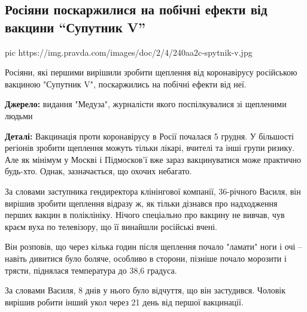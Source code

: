  
 
 
 
 
 
\subsection{Росіяни поскаржилися на побічні ефекти від вакцини \enquote{Супутник V}}
\label{sec:22_12_2020.news.ua.pravda.1.sputnik_v_pobichni_effekty}

\ifcmt
pic https://img.pravda.com/images/doc/2/4/240aa2c-spytnik-v.jpg
\fi

Росіяни, які першими вирішили зробити щеплення від коронавірусу російською
вакциною "Супутник V", поскаржились на побічні ефекти від неї.

\textbf{Джерело:} видання "Медуза", журналісти якого поспілкувалися зі щепленими людьми

\textbf{Деталі:} Вакцинація проти коронавірусу в Росії почалася 5 грудня. У більшості
регіонів зробити щеплення можуть тільки лікарі, вчителі та інші групи ризику.
Але як мінімум у Москві і Підмосков'ї вже зараз вакцинуватися може практично
будь-хто. Однак, зазначається, що охочих небагато.

За словами заступника гендиректора клінінгової компанії, 36-річного Василя, він
вирішив зробити щеплення відразу ж, як тільки дізнався про надходження перших
вакцин в поліклініку. Нічого спеціально про вакцину не вивчав, чув краєм вуха
по телевізору, що її винайшли російські вчені.

Він розповів, що через кілька годин після щеплення почало "ламати" ноги і очі –
навіть дивитися було боляче, особливо в сторони, пізніше почало морозити і
трясти, піднялася температура до 38,6 градуса.

За словами Василя, 8 днів у нього було відчуття, що він застудився. Чоловік
вирішив робити інший укол через 21 день від першої вакцинації.


